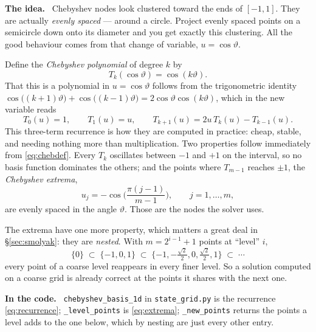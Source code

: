 \documentclass[10pt,a4paper]{article}
\newenvironment{idea}{\begin{shaded}\noindent\textbf{The idea.}\ }{\end{shaded}}
\newenvironment{incode}{\begin{leftbar}\small\noindent\textcolor{codecol}{\textbf{In the code.}}\ }{\end{leftbar}}
\theoremstyle{plain}
\theoremstyle{remark}
\newcommand{\file}[1]{\textcolor{codecol}{\texttt{#1}}}
\newcommand{\code}[1]{\texttt{#1}}
\begin{document}
\begin{idea}
Chebyshev nodes look clustered toward the ends of $[-1,1]$. They are actually \emph{evenly
spaced} --- around a circle. Project evenly spaced points on a semicircle down onto its
diameter and you get exactly this clustering. All the good behaviour comes from that change
of variable, $u = \cos\vartheta$.
\end{idea}

\noindent Define the \emph{Chebyshev polynomial} of degree $k$ by
\begin{equation}
  T_k(\cos\vartheta) = \cos(k\vartheta).
  \label{eq:chebdef}
\end{equation}
That this is a polynomial in $u=\cos\vartheta$ follows from the trigonometric identity
$\cos\big((k{+}1)\vartheta\big) + \cos\big((k{-}1)\vartheta\big) = 2\cos\vartheta\cos(k\vartheta)$,
which in the new variable reads
\begin{equation}
  T_0(u)=1,\qquad T_1(u)=u,\qquad T_{k+1}(u) = 2u\,T_k(u) - T_{k-1}(u).
  \label{eq:recurrence}
\end{equation}
This three-term recurrence is how they are computed in practice: cheap, stable, and needing
nothing more than multiplication. Two properties follow immediately from
\eqref{eq:chebdef}. Every $T_k$ oscillates between $-1$ and $+1$ on the interval, so no
basis function dominates the others; and the points where $T_{m-1}$ reaches $\pm1$, the
\emph{Chebyshev extrema},
\begin{equation}
  u_j = -\cos\!\Big(\frac{\pi(j-1)}{m-1}\Big),\qquad j = 1,\dots,m,
  \label{eq:extrema}
\end{equation}
are evenly spaced in the angle $\vartheta$. Those are the nodes the solver uses.

The extrema have one more property, which matters a great deal in \S\ref{sec:smolyak}: they
are \emph{nested}. With $m = 2^{i-1}+1$ points at ``level'' $i$,
\[
  \{0\}\;\subset\;\{-1,0,1\}\;\subset\;\{-1,-\tfrac{\sqrt2}{2},0,\tfrac{\sqrt2}{2},1\}\;\subset\;\cdots
\]
every point of a coarse level reappears in every finer level. So a solution computed on a
coarse grid is already correct at the points it shares with the next one.

\begin{incode}
\code{chebyshev\_basis\_1d} in \file{state\_grid.py} is the recurrence \eqref{eq:recurrence};
\code{\_level\_points} is \eqref{eq:extrema}; \code{\_new\_points} returns the points a level adds
to the one below, which by nesting are just every other entry.
\end{incode}
\end{document}
